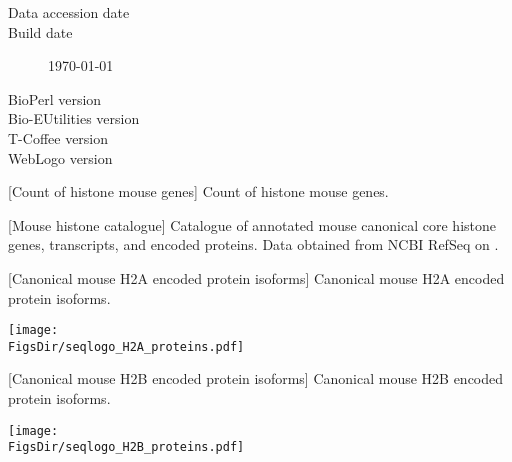  \begin{description}
    \item[Data accession date] \hfill \newline
      \printdate{\SequencesDate}
    \item[Build date] \hfill \newline
      \today
    \item[BioPerl version] \hfill \newline
      \BioPerlVersion{}
    \item[Bio-EUtilities version] \hfill \newline
      \BioEUtilitiesVersion
    \item[T-Coffee version] \hfill \newline
      \TCoffeVersion
    \item[WebLogo version] \hfill \newline
      \WebLogoVersion
  \end{description}

  \newpage
  \begin{center}
  [Count of histone mouse genes]%
                   {Count of histone mouse genes.}
  
  \end{center}

  \newpage
  \begin{center}
  [Mouse histone catalogue]{%
    Catalogue of annotated mouse canonical core histone genes, transcripts,
    and encoded proteins.
    Data obtained from NCBI RefSeq \citep{OLearyRefseq2016} on \SequencesDate{}.
  }
  \label{tab:mouse:histone-catalogue}
  
  \end{center}

  \newpage
  \begin{center}
  [Canonical mouse H2A encoded protein isoforms]%
                   {Canonical mouse H2A encoded protein isoforms.}
  
  \texttt{[image: \\FigsDir/seqlogo\_H2A\_proteins.pdf]}
  \end{center}

  \newpage
  \begin{center}
  [Canonical mouse H2B encoded protein isoforms]%
                   {Canonical mouse H2B encoded protein isoforms.}
  
  \texttt{[image: \\FigsDir/seqlogo\_H2B\_proteins.pdf]}
  \end{center}

